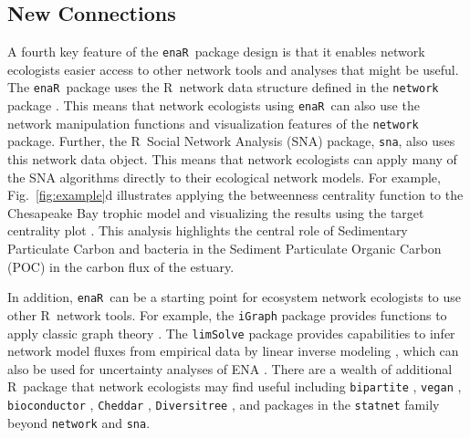 \documentclass[11pt]{article}
\newcommand{\R}{R}
\newcommand{\enaR}{\texttt{enaR}}
\begin{document}
\begin{spacing}{2}
\subsection{New Connections}
A fourth key feature of the \enaR\ package design is that it enables
network ecologists easier access to other network tools and analyses
that might be useful.  The \enaR\ package uses the \R\ network data
structure defined in the \texttt{network} package
\citep{butts08_network}.  This means that network ecologists using \enaR\
can also use the network manipulation functions and visualization
features of the \texttt{network} package. Further, the \R\ Social
Network Analysis (SNA) package, \texttt{sna}, \citep{butts08_social} also uses this
network data object.  This means that network ecologists can apply
many of the SNA algorithms directly to their ecological network
models.  For example, Fig.~\ref{fig:example}d illustrates applying the betweenness
centrality function to the Chesapeake Bay trophic model
\citep{baird89} and visualizing the results using the target
centrality plot \citep{brandes03}.  This analysis highlights the
central role of Sedimentary Particulate Carbon and bacteria in the
Sediment Particulate Organic Carbon (POC) in the carbon flux of the
estuary.

In addition, \enaR\ can be a starting point for ecosystem network
ecologists to use other \R\ network tools.  For example, the
\texttt{iGraph} package provides functions to apply classic graph
theory \citep{csardi06}.  The \texttt{limSolve} package provides
capabilities to infer network model fluxes from empirical data by
linear inverse modeling \citep{soetaert09}, which can also be used for
uncertainty analyses of ENA \citep{kones09}. There are a wealth of
additional \R\ package that network ecologists may find useful
including \texttt{bipartite} \citep{dormann2008}, \texttt{vegan}
\citep{dixon2003vegan}, \texttt{bioconductor}
\citep{gentleman2004bioconductor}, \texttt{Cheddar}
\citep{hudson2013}, \texttt{Diversitree} \citep{fitzjohn2012}, and
packages in the \texttt{statnet} family \citep{handcock2008statnet}
beyond \texttt{network} and \texttt{sna}.


\end{spacing}
\end{document}
